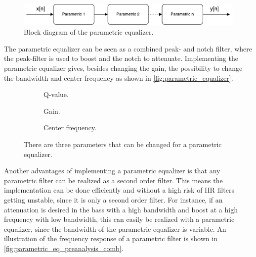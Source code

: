 \begin{figure}[H]
\centering
\includegraphics[width=0.8 \textwidth]{figures/parametric_eq.pdf}
\caption{Block diagram of the parametric equalizer.}
\label{fig:parametric_eq}
\end{figure}

The parametric equalizer can be seen as a combined peak- and notch filter, where the peak-filter is used to boost and the notch to attenuate. Implementing the parametric equalizer gives, besides changing the gain, the possibility to change the bandwidth and center frequency as shown in \autoref{fig:parametric_equalizer}.

\begin{figure}[H]
\centering
\hspace*{-1cm}
\begin{subfigure}[t]{0.3\textwidth}
	
	\caption{Q-value.}
	\label{fig:parametric_q}
\end{subfigure}
\hspace{2mm} 
\begin{subfigure}[t]{0.3\textwidth}
	
	\caption{Gain.}
	\label{fig:parametric_db}
\end{subfigure}
\hspace{2mm}
\begin{subfigure}[t]{0.3\textwidth}
	
	\caption{Center frequency.}
	\label{fig:parametric_fc}
\end{subfigure}
\caption{There are three parameters that can be changed for a parametric equalizer.}
\label{fig:parametric_equalizer}
\end{figure}

Another advantages of implementing a parametric equalizer is that any parametric filter can be realized as a second order filter. This means the implementation can be done efficiently and without a high risk of IIR filters getting unstable, since it is only a second order filter. For instance, if an attenuation is desired in the bass with a high bandwidth and boost at a high frequency with low bandwidth, this can easily be realized with a parametric equalizer, since the bandwidth of the parametric equalizer is variable. An illustration of the frequency response of a parametric filter is shown in \autoref{fig:parametric_eq_preanalysis_comb}.

